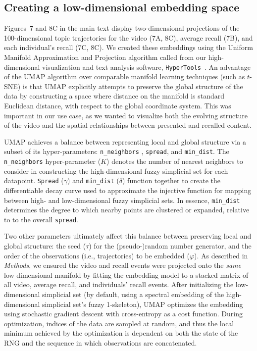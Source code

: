 \documentclass{article}
\begin{document}
\subsection*{Creating a low-dimensional embedding space}
Figures~7 and 8C in the main text display two-dimensional projections of the 100-dimensional topic trajectories for the video (7A, 8C), average recall (7B), and each individual's recall (7C, 8C).  We created these embeddings using the Uniform Manifold Approximation and Projection algorithm \citep[UMAP;][]{McInEtal18} called from our high-dimensional visualization and text analysis software, \texttt{HyperTools}~\citep{HeusEtal18a}.  An advantage of the UMAP algorithm over comparable manifold learning techniques (such as $t$-SNE) is that UMAP explicitly attempts to preserve the global structure of the data \citep{McInEtal18,BechEtal19} by constructing a space where distance on the manifold is standard Euclidean distance, with respect to the global coordinate system.  This was important in our use case, as we wanted to visualize both the evolving structure of the video and the spatial relationships between presented and recalled content.

UMAP achieves a balance between representing local and global structure via a subset of its hyper-parameters: \texttt{n\_neighbors} , \texttt{spread}, and \texttt{min\_dist}.  The \texttt{n\_neighbors} hyper-parameter ($K$) denotes the number of nearest neighbors to consider in constructing the high-dimensional fuzzy simplicial set for each datapoint.  \texttt{Spread} ($\gamma$) and \texttt{min\_dist} ($\delta$) function together to create the differentiable decay curve used to approximate the injective function for mapping between high- and low-dimensional fuzzy simplicial sets.  In essence, \texttt{min\_dist} determines the degree to which nearby points are clustered or expanded, relative to to the overall \texttt{spread}.

Two other parameters ultimately affect this balance between preserving local and global structure: the seed ($\tau$) for the (pseudo-)random number generator, and the order of the observations (i.e., trajectories) to be embedded ($\varphi$).  As described in \textit{Methods}, we ensured the video and recall events were projected onto the \textit{same} low-dimensional manifold by fitting the embedding model to a stacked matrix of all video, average recall, and individuals' recall events.  After initializing the low-dimensional simplicial set (by default, using a spectral embedding of the high-dimensional simplicial set's fuzzy 1-skeleton), UMAP optimizes the embedding using stochastic gradient descent with cross-entropy as a cost function.  During optimization, indices of the data are sampled at random, and thus the local minimum achieved by the optimization is dependent on both the state of the RNG and the sequence in which observations are concatenated.
\end{document}
